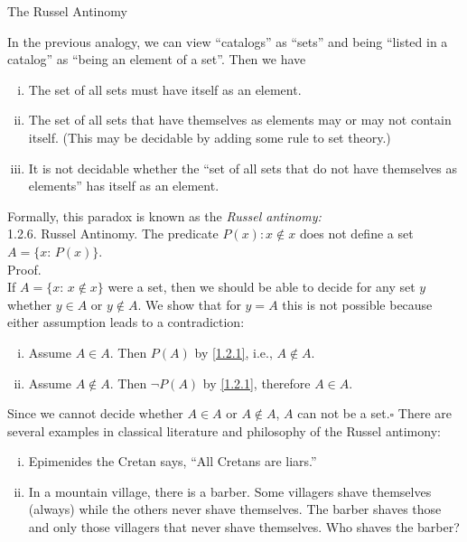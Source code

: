 \documentclass[smaller,hyperref={CJKbookmarks=true}]{beamer}
\begin{document}
\begin{frame}{The Russel Antinomy}
\begin{spacing}{1.2}
\vspace*{11pt}
In the previous analogy, we can view ``catalogs'' as ``sets'' and being ``listed
in a catalog'' as ``being an element of a set''. Then we have
\begin{enumerate}[(i)]
  \item The set of all sets must have itself as an element.
  \item The set of all sets that have themselves as elements may or may not
      contain itself. (This may be decidable by adding some rule to set theory.)
  \item It is not decidable whether the ``set of all sets that do not have
      themselves as elements'' has itself as an element.
\end{enumerate}
\newpage
\vspace*{3pt}
Formally, this paradox is known as the \emph{Russel antinomy:}\\[6pt]
\alert{1.2.6. Russel Antinomy.} The predicate $P(x)\!:x\notin x$ does not define a set $A=\{x\!:\,P(x)\}$.\\[5pt]
\alert{Proof.}\\
If $A=\{x\!:\,x\notin x\}$ were a set, then we should be able to decide for any set $y$ whether $y\in A$ or $y\notin A$. We show that for $y=A$ this is not possible because either assumption leads to a contradiction:
\begin{enumerate}[(i)]
  \item Assume $A\in A$. Then $P(A)$ by \eqref{1.2.1}, i.e., $A\notin A$. \textcolor[rgb]{1.00,0.00,0.00}{\Lightning}
  \item Assume $A\notin A$. Then $\neg P(A)$ by \eqref{1.2.1}, therefore $A\in A$. \textcolor[rgb]{1.00,0.00,0.00}{\Lightning}
\end{enumerate}
Since we cannot decide whether $A\in A$ or $A\notin A$, $A$ can not be a set.\qquad\qquad\quad$\square$
\newpage
\vspace*{10pt}
There are several examples in classical literature and philosophy of the
Russel antimony:
\begin{enumerate}[(i)]
  \item Epimenides the Cretan says, ``All Cretans are liars.''
  \item In a mountain village, there is a barber. Some villagers shave
      themselves (always) while the others never shave themselves. The
      barber shaves those and only those villagers that never shave themselves. Who shaves the barber?
\end{enumerate}
\end{spacing}
\end{frame}
\end{document}
